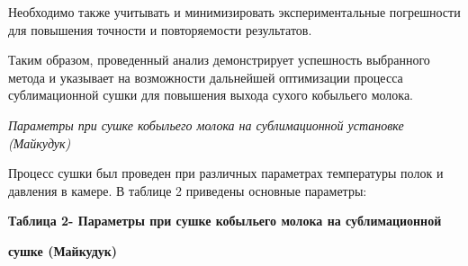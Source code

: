 Необходимо также учитывать и минимизировать экспериментальные
погрешности для повышения точности и повторяемости результатов.

Таким образом, проведенный анализ демонстрирует успешность выбранного
метода и указывает на возможности дальнейшей оптимизации процесса
сублимационной сушки для повышения выхода сухого кобыльего молока.

\emph{Параметры при сушке кобыльего молока на сублимационной установке
(Майкудук)}

Процесс сушки был проведен при различных параметрах температуры полок и
давления в камере. В таблице 2 приведены основные параметры:

{\bfseries Таблица 2- Параметры при сушке кобыльего молока на
сублимационной}

{\bfseries сушке (Майкудук)}

